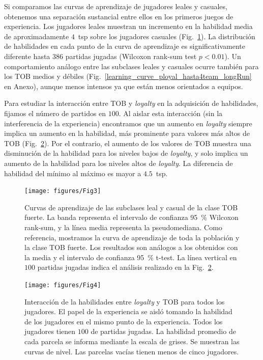 \documentclass[a4paper,11pt]{book}
\theoremstyle{definition}
\begin{document}

Si comparamos las curvas de aprendizaje de jugadores leales y casuales, obtenemos una separaci\'on sustancial entre ellos en los primeros juegos de experiencia.
%
Los jugadores leales muestran un incremento en la habilidad media de aproximadamente $4$~tsp sobre los jugadores casuales (Fig.~\ref{learningskill_pteam89_ployal}).
%
La distribuci\'on de habilidades en cada punto de la curva de aprendizaje es significativamente diferente hasta $386$ partidas jugadas (Wilcoxon rank-sum test $p<0.01$).
%
Un comportamiento an\'alogo entre las subclases leales y casuales ocurre tambi\'en para los TOB medios y d\'ebiles (Fig.~\ref{learning_curve_ployal_hasta4team_longRun} en Anexo), aunque menos intensos ya que est\'an menos orientados a equipos.


Para estudiar la interacci\'on entre TOB y \emph{loyalty} en la adquisici\'on de habilidades, fijamos el n\'umero de partidos en $100$.
%
Al aislar esta interacci\'on (sin la interferencia de la experiencia) encontramos que un aumento en \emph{loyalty} siempre implica un aumento en la habilidad, m\'as prominente para valores m\'as altos de TOB (Fig.~\ref{skillModels_loyaltyTeamOriented_imageEmpirical}).
%
Por el contrario, el aumento de los valores de TOB muestra una disminuci\'on de la habilidad para los niveles bajos de \emph{loyalty}, y solo implica un aumento de la habilidad para los niveles altos de \emph{loyalty}.
%
La diferencia de habilidad del m\'inimo al m\'aximo es mayor a $4.5$~tsp.

\clearpage
\begin{figure}[ht!]
\centering
\texttt{[image: figures/Fig3]}
\caption{
Curvas de aprendizaje de las subclases leal y casual de la clase TOB fuerte.
%
La banda representa el intervalo de confianza \SI{95}{\percent} Wilcoxon rank-sum, y la l\'inea media representa la pseudomediana.
%
Como referencia, mostramos la curva de aprendizaje de toda la poblaci\'on y la clase TOB fuerte.
%
Los resultados son an\'alogos a los obtenidos con la media y el intervalo de confianza \SI{95}{\percent} t-test.
%
La l\'inea vertical en $100$ partidas jugadas indica el an\'alisis realizado en la Fig.~\protect\ref{skillModels_loyaltyTeamOriented_imageEmpirical}.
}
\label{learningskill_pteam89_ployal}
\end{figure}

\begin{figure}[ht!]
\centering
\texttt{[image: figures/Fig4]}
\caption{
Interacci\'on de la habilidades entre \emph{loyalty} y TOB para todos los jugadores.
%
El papel de la experiencia se aisl\'o tomando la habilidad de los jugadores en el mismo punto de la experiencia.
%
Todos los jugadores tienen $100$ de partidas jugadas.
%
La habilidad promedio de cada parcela se informa mediante la escala de grises.
%
Se muestran las curvas de nivel.
%
Las parcelas vac\'ias tienen menos de cinco jugadores.
}
\label{skillModels_loyaltyTeamOriented_imageEmpirical}
\end{figure}
\end{document}
